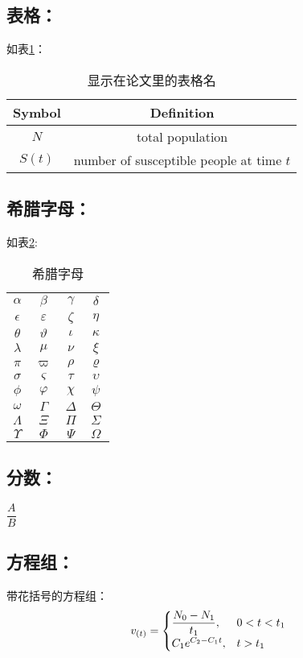 \documentclass[UTF8]{ctexart}
\begin{document}
\subsection{表格：}
如表\ref{tab:引用名称}：
\begin{table}[H]%
    \centering
    \caption{显示在论文里的表格名}
    \label{tab:引用名称}
    \begin{tabular}{c c}%
\hline
    	Symbol & Definition\\
\hline
	$N$ & total population\\
	$S(t)$ & number of susceptible people at time $t$\\
\hline
    \end{tabular}
\end{table}

\subsection{希腊字母：} 
如表\ref{tab:希腊字母}:
\begin{table}[H]
\centering
\caption{希腊字母}
\label{tab:希腊字母}
\begin{tabular}{|c c c c|}
\hline
$\alpha$ &$\beta$ &$\gamma$ &$\delta$ \\
$\epsilon$ &$\varepsilon $ &$\zeta$ &$\eta$ \\
$\theta$ &$\vartheta$ &$\iota$ &$\kappa$ \\
$\lambda$ &$\mu$ &$\nu$ &$\xi$ \\
$\pi$ &$\varpi$ &$\rho$ &$\varrho$ \\
$\sigma$ &$\varsigma$ &$\tau$ &$\upsilon$\\
$\phi$ &$\varphi$ &$\chi$ &$\psi$\\
$\omega$ &$\Gamma$ &$\Delta$ &$\Theta$\\
$\Lambda$ &$\Xi$ &$\Pi $&$\Sigma$\\
$\Upsilon$ &$\Phi $&$\Psi$ &$\Omega$\\
\hline
\end{tabular}
\end{table}

\subsection{分数：} 
$\dfrac{A}{B}$

\subsection{方程组：} 
带花括号的方程组：
\begin{displaymath}
v_{(t)}=\begin{cases}
\dfrac{N_{0}-N_{1}}{t_{1}},&0<t<t_{1}\cr
C_1e^{C_2-C_1t},&t>t_1\end{cases}
\end{displaymath}
\end{document}
